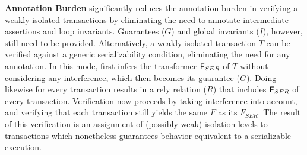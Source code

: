 \textbf{Annotation Burden} \tool significantly reduces the annotation
burden in verifying a weakly isolated transactions by eliminating the
need to annotate intermediate assertions and loop invariants.
Guarantees ($G$) and global invariants ($I$), however, still need to be
provided. Alternatively, a weakly isolated transaction $T$ can be
verified against a generic serializability condition,  eliminating
the need for any annotation. In this mode, \tool first infers the
transformer ${\sf F}_{SER}$ of $T$ without considering any interference,
which then becomes its guarantee ($G$). Doing likewise for every
transaction results in a rely relation ($R$) that includes ${\sf F}_{SER}$
of every transaction. Verification now proceeds by taking interference
into account, and verifying that each transaction still yields the
same $F$ as its $F_{SER}$. The result of this verification is an
assignment of (possibly weak) isolation levels to transactions which
nonetheless guarantees behavior equivalent to a  serializable execution.



